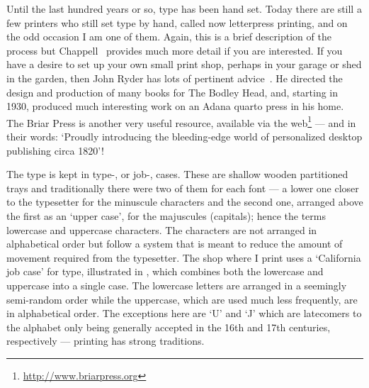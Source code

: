 \documentclass[10pt,letterpaper,extrafontsizes]{memoir}
\begin{document}
   Until the last hundred years or so, type has been hand set. Today there
are still a few printers who still set type by hand, called 
now letterpress printing, and on the odd occasion I am 
one of them. Again, this is a brief description of the process but 
Chappell~\autocite{CHAPPELL99}
provides much more detail if you are interested. If you have a desire to
set up your own small print shop, perhaps in your garage or shed in the garden,
then John Ryder has lots of pertinent advice~\autocite{RYDER}. 
He directed
the design and production of many books for The Bodley Head, and, starting in
1930, produced much interesting work on an Adana 
quarto press in his home.
The Briar Press is another very useful resource, 
available via the web\label{briar}\footnote{\url{http://www.briarpress.org}} 
--- and in their words: `Proudly
introducing the bleeding-edge world of personalized desktop publishing
circa 1820'!

    The type is kept in type-, or job-, cases. 
These are shallow wooden 
partitioned trays and traditionally there were two of them for each font --- 
a lower one closer to the typesetter for the minuscule characters and the 
second one, arranged above the first as an `upper case', for the majuscules
(capitals); hence the terms lowercase and uppercase characters. The
characters are not arranged in alphabetical order but follow a system
that is meant to reduce the amount of movement required from the typesetter.
The shop where I print uses a `California job case' for type, 
illustrated in , which combines both the lowercase and 
uppercase into a single case. The lowercase letters are arranged in a 
seemingly semi-random order while the uppercase, which are used much less
frequently, are in alphabetical order. The exceptions here are `U' and `J' 
which are latecomers to the alphabet only being generally accepted in the 16th
and 17th centuries, respectively --- printing has strong traditions.
\end{document}
